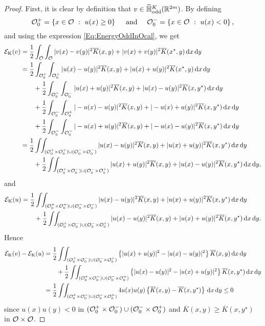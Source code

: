 \begin{proof}
First, it is clear by definition that $v\in \widetilde{\mathbb{H}}^K_{\mathrm{odd}}(\mathbb{R}^{2m})$. By defining
$$ \mathcal{O}_0^+ = \left \{  x\in \mathcal{O} \ : \ u(x)\geq 0 \right \} \quad \textrm{ and } \quad \mathcal{O}_0^- = \left \{  x\in \mathcal{O} \ : \ u(x) < 0 \right \}, $$
and using the expression \eqref{Eq:EnergyOddInOcal}, we get
\begin{align*}
\mathcal{E}_\mathrm{K}(v) &= \frac{1}{2}\int_{\mathcal{O}} \int_{\mathcal{O}}|v(x) - v(y)|^2 \overline{K}(x,y) + |v(x) + v(y)|^2 \overline{K}(x^\star,y) \,\mathrm{d} x \,\mathrm{d} y \\
&= \frac{1}{2}\int_{\mathcal{O}_0^+} \int_{\mathcal{O}_0^+}|u(x) - u(y)|^2 \overline{K}(x,y) + |u(x) + u(y)|^2 \overline{K}(x^\star,y) \,\mathrm{d} x \,\mathrm{d} y \\
&\quad \quad+ \frac{1}{2}\int_{\mathcal{O}_0^+} \int_{\mathcal{O}_0^-}|u(x) + u(y)|^2 \overline{K}(x,y) + |u(x) - u(y)|^2 \overline{K}(x,y^\star) \,\mathrm{d} x \,\mathrm{d} y \\
&\quad \quad+ \frac{1}{2}\int_{\mathcal{O}_0^-} \int_{\mathcal{O}_0^+}|-u(x) - u(y)|^2 \overline{K}(x,y) + |-u(x) + u(y)|^2 \overline{K}(x,y^\star) \,\mathrm{d} x \,\mathrm{d} y \\
&\quad \quad+ \frac{1}{2}\int_{\mathcal{O}_0^-} \int_{\mathcal{O}_0^-}|-u(x) + u(y)|^2 \overline{K}(x,y) + |-u(x) - u(y)|^2 \overline{K}(x,y^\star) \,\mathrm{d} x \,\mathrm{d} y \\
&= \frac{1}{2}\int\!\!\int_{(\mathcal{O}_0^+\times\mathcal{O}_0^+) \cup (\mathcal{O}_0^-\times\mathcal{O}_0^-)}|u(x) - u(y)|^2 \overline{K}(x,y) + |u(x) + u(y)|^2 \overline{K}(x,y^\star) \,\mathrm{d} x \,\mathrm{d} y \\
&\quad \quad+ \frac{1}{2}\int\!\!\int_{(\mathcal{O}_0^+\times\mathcal{O}_0^-) \cup (\mathcal{O}_0^-\times\mathcal{O}_0^+)}|u(x) + u(y)|^2 \overline{K}(x,y) + |u(x) - u(y)|^2 \overline{K}(x,y^\star) \,\mathrm{d} x \,\mathrm{d} y,
\end{align*}
and
\begin{align*}
\mathcal{E}_\mathrm{K}(u) &= \frac{1}{2}\int\!\!\int_{(\mathcal{O}_0^+\times\mathcal{O}_0^+) \cup (\mathcal{O}_0^-\times\mathcal{O}_0^-)}|u(x) - u(y)|^2 \overline{K}(x,y) + |u(x) + u(y)|^2 \overline{K}(x,y^\star) \,\mathrm{d} x \,\mathrm{d} y \\
&\quad \quad+ \frac{1}{2}\int\!\!\int_{(\mathcal{O}_0^+\times\mathcal{O}_0^-) \cup (\mathcal{O}_0^-\times\mathcal{O}_0^+)}|u(x) - u(y)|^2 \overline{K}(x,y) + |u(x) + u(y)|^2 \overline{K}(x,y^\star) \,\mathrm{d} x \,\mathrm{d} y.
\end{align*}
Hence
\begin{align*}
\mathcal{E}_\mathrm{K}(v) - \mathcal{E}_\mathrm{K}(u) &= \frac{1}{2}\int\!\!\int_{(\mathcal{O}_0^+\times\mathcal{O}_0^-) \cup (\mathcal{O}_0^-\times\mathcal{O}_0^+)} \left\{ |u(x) + u(y)|^2 - |u(x) - u(y)|^2 \right\} \overline{K}(x,y) \,\mathrm{d} x \,\mathrm{d} y \\
&\quad \quad+ \frac{1}{2}\int\!\!\int_{(\mathcal{O}_0^+\times\mathcal{O}_0^-) \cup (\mathcal{O}_0^-\times\mathcal{O}_0^+)} \left\{ |u(x) - u(y)|^2 - |u(x) + u(y)|^2 \right\} \overline{K}(x,y^\star) \,\mathrm{d} x \,\mathrm{d} y \\
&= \frac{1}{2}\int\!\!\int_{(\mathcal{O}_0^+\times\mathcal{O}_0^-) \cup (\mathcal{O}_0^-\times\mathcal{O}_0^+)} 4u(x)u(y) \left\{ \overline{K}(x,y)-\overline{K}(x,y^\star) \right\} \,\mathrm{d} x \,\mathrm{d} y \leq 0
\end{align*}
since $u(x)u(y)<0$ in $(\mathcal{O}_0^+\times\mathcal{O}_0^-) \cup (\mathcal{O}_0^-\times\mathcal{O}_0^+)$ and $\overline{K}(x,y)\geq \overline{K}(x,y^\star)$  in $\mathcal{O} \times \mathcal{O}$.


\end{proof}
